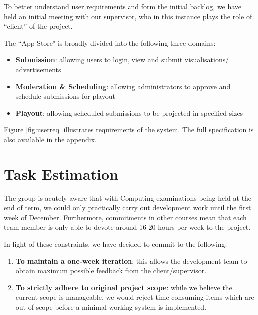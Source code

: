 \documentclass[a4paper]{article}
\begin{document}
To better understand user requirements and form the initial backlog, we have
held an initial meeting with our supervisor, who in this instance plays the role of ``client'' of the 
project.

The ``App Store" is broadly divided into the following three domains:
\begin{itemize}
  \item \textbf{Submission}: allowing users to login, view and submit 
        visualisations/ advertisements
  \item \textbf{Moderation \& Scheduling}: allowing administrators to approve
        and schedule submissions for playout
  \item \textbf{Playout}: allowing scheduled submissions to be projected in
        specified sizes

\end{itemize}



Figure \ref{fig:userreq} illustrates requirements of the system.
The full specification is also available in the appendix.

\section{Task Estimation}
The group is acutely aware that with Computing examinations being held at the
end of term, we could only practically carry out development work until the
first week of December. Furthermore, commitments in other courses mean that 
each team member is only able to devote around 16-20 hours per week to
the project.

In light of these constraints, we have decided to commit to the following:
\begin{enumerate}
  \item \textbf{To maintain a one-week iteration}: this allows the development team to
        obtain maximum possible feedback from the client/supervisor.
  \item \textbf{To strictly adhere to original project scope}: while we believe the
        current scope is manageable, we would reject time-consuming items which
        are out of scope before a minimal working system is implemented.
\end{enumerate}
\end{document}
